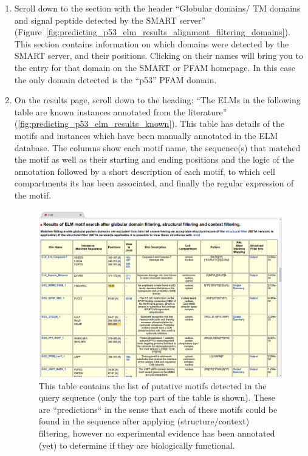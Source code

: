 \documentclass[12pt]{article}
\begin{document}
\begin{enumerate}
	\item Scroll down to the section with the header ``Globular domains/ TM domains
		and signal peptide detected by the SMART server''
		(Figure~\ref{fig:predicting_p53_elm_results_alignment_filtering_domains}).
		This section contains information on which domains were detected by the
		SMART server, and their positions. Clicking on their names will bring
		you to the entry for that domain on the SMART or PFAM homepage.
		In this case the only domain detected is the ``p53'' PFAM domain.

	\item On the results page, scroll down to the heading: ``The ELMs in the
		following table are known instances annotated from the literature''
		(\ref{fig:predicting_p53_elm_results_known}).
		This table has details of the motifs and instances which have been
		manually annotated in the ELM database. The columns show each motif
		name, the sequence(s) that matched the motif as well as their starting
		and ending positions and the logic of the annotation followed by a
		short description of each motif, to which cell compartments its has
		been associated, and finally the regular expression of the motif.

	\begin{figure}[h!]
		\centering
		\includegraphics[width=\textwidth]{Figures/predicting_p53/elm_results_motifs.png}
		\caption{
		This table contains the list of putative motifs detected in the query sequence (only
		the top part of the table is shown). These are ``predictions`` in the sense
		that each of these motifs could be found in the sequence after applying (structure/context) filtering, however no experimental evidence has been annotated (yet) to determine if they are biologically functional.
		}
		\label{fig:predicting_p53_elm_results_motifs}
	\end{figure}


\end{enumerate}
\end{document}
